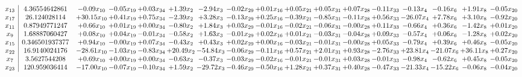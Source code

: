 \documentclass[9pt]{article}
\begin{document}
 \[\begin{array}{c| c c@{\hskip 2pt} c@{\hskip 2pt} c@{\hskip 2pt} c@{\hskip 2pt} c@{\hskip 2pt} c@{\hskip 2pt} c@{\hskip 2pt} c@{\hskip 2pt} c@{\hskip 2pt} c@{\hskip 2pt} c@{\hskip 2pt} c@{\hskip 2pt} c@{\hskip 2pt} c@{\hskip 2pt} c@{\hskip 2pt} }
 x_{13}   &  4.36554642861 & -0.09 x_{10} & -0.05 x_{19} & +  0.03 x_{34} & +  1.39 x_{2} & -2.94 x_{3} & -0.02 x_{29} & +  0.01 x_{16} & +  0.05 x_{21} & +  0.05 x_{31} & +  0.07 x_{28} & -0.11 x_{33} & -0.13 x_{4} & -0.16 x_{6} & +  1.91 x_{8} & -0.05 x_{20}\\
 x_{17}   &  26.124028114 & + 30.15 x_{10} & +  0.41 x_{19} & +  0.75 x_{34} & -2.39 x_{2} & +  3.28 x_{3} & -0.13 x_{29} & +  0.25 x_{16} & -0.39 x_{21} & -0.85 x_{31} & -0.11 x_{28} & +  0.56 x_{33} & -26.07 x_{4} & +  7.78 x_{6} & +  3.10 x_{8} & -0.92 x_{20}\\
 x_{11}   &  0.87949771247 & +  0.66 x_{10} & +  0.01 x_{19} & +  0.00 x_{34} & -0.80 x_{2} & +  1.84 x_{3} & +  0.03 x_{29} & -0.01 x_{16} & -0.02 x_{21} & -0.06 x_{31} & -0.00 x_{28} & +  0.11 x_{33} & -0.66 x_{4} & +  0.36 x_{6} & -1.42 x_{8} & +  0.01 x_{20}\\
 x_{9}   &  1.68887060427 & +  0.08 x_{10} & +  0.04 x_{19} & -0.01 x_{34} & -0.58 x_{2} & +  1.63 x_{3} & -0.01 x_{29} & +  0.02 x_{16} & +  0.01 x_{21} & -0.03 x_{31} & -0.04 x_{28} & +  0.09 x_{33} & -0.57 x_{4} & +  0.06 x_{6} & -1.28 x_{8} & +  0.02 x_{20}\\
 x_{15}   &  0.346501937377 & +  0.94 x_{10} & -0.00 x_{19} & +  0.07 x_{34} & -0.43 x_{2} & +  0.43 x_{3} & +  0.02 x_{29} & +  0.00 x_{16} & -0.03 x_{21} & -0.01 x_{31} & -0.00 x_{28} & +  0.05 x_{33} & -0.79 x_{4} & +  0.39 x_{6} & +  0.46 x_{8} & -0.05 x_{20}\\
 x_{22}   &  16.9140024176 & -28.61 x_{10} & -1.03 x_{19} & -0.83 x_{34} & + 20.49 x_{2} & -54.84 x_{3} & -0.06 x_{29} & -0.11 x_{16} & +  0.57 x_{21} & +  2.01 x_{31} & +  0.93 x_{28} & -2.76 x_{33} & + 23.81 x_{4} & -21.07 x_{6} & + 36.11 x_{8} & +  0.27 x_{20}\\
 x_{7}   &  3.5627544208 & +  0.69 x_{10} & +  0.00 x_{19} & +  0.00 x_{34} & -0.63 x_{2} & -0.37 x_{3} & -0.03 x_{29} & -0.02 x_{16} & -0.01 x_{21} & -0.01 x_{31} & +  0.03 x_{28} & -0.01 x_{33} & -0.98 x_{4} & -0.62 x_{6} & +  0.45 x_{8} & -0.05 x_{20}\\
 x_{23}   &  120.959036414 & -17.00 x_{10} & -0.07 x_{19} & -0.10 x_{34} & +  1.59 x_{2} & -29.72 x_{3} & -0.46 x_{29} & -0.50 x_{16} & +  1.28 x_{21} & +  0.37 x_{31} & +  0.40 x_{28} & -0.47 x_{33} & -21.33 x_{4} & -15.22 x_{6} & -0.06 x_{8} & -0.04 x_{20}\\

\end{array}\]
\end{document}
